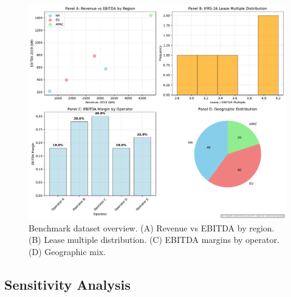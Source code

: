 \documentclass[11pt,a4paper]{article}
\theoremstyle{plain}
\theoremstyle{definition}
\begin{document}
\begin{figure}[H]
\centering
\includegraphics[width=\textwidth]{F13_benchmark_overview}
\caption{Benchmark dataset overview. (A) Revenue vs EBITDA by region. (B) Lease multiple distribution. (C) EBITDA margins by operator. (D) Geographic mix.}
\label{fig:benchmark_overview}
\end{figure}

\subsection{Sensitivity Analysis}
\end{document}
